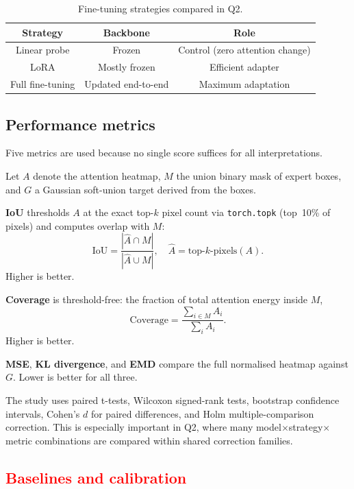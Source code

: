 \documentclass[lineno,pdflatex,sn-mathphys-num]{sn-jnl}%
\theoremstyle{thmstyleone}%
\theoremstyle{thmstyletwo}%
\theoremstyle{thmstylethree}%
\begin{document}
\begin{table}[!h]
\centering
\caption{Fine-tuning strategies compared in Q2. \label{table fine tuning list}}
\begin{tabular}{ccc}
\toprule
Strategy & Backbone & Role \\ \midrule
Linear probe & Frozen & Control (zero attention change) \\
LoRA         & Mostly frozen & Efficient adapter \\
Full fine-tuning   & Updated end-to-end & Maximum adaptation \\
\bottomrule
\end{tabular}
\end{table}

\subsection{Performance metrics}

Five metrics are used because no single score suffices for all interpretations.

Let $A$ denote the attention heatmap, $M$ the union binary mask of expert boxes, and $G$ a Gaussian soft-union target derived from the boxes.

\textbf{IoU} thresholds $A$ at the exact top-$k$ pixel count via
\texttt{torch.topk} (top~10\% of pixels) and computes overlap with $M$:
\begin{equation}
  \text{IoU} = \frac{|\hat{A} \cap M|}{|\hat{A} \cup M|}, \quad
  \hat{A} = \text{top-}k\text{-pixels}(A).
\end{equation}
Higher is better.

\textbf{Coverage} is threshold-free: the fraction of total attention energy
inside $M$,
\begin{equation}
  \text{Coverage} = \frac{\sum_{i \in M} A_i}{\sum_i A_i}.
\end{equation}
Higher is better.

\textbf{MSE}, \textbf{KL divergence}, and \textbf{EMD} compare the full
normalised heatmap against $G$. Lower is better for all three.


The study uses paired t-tests, Wilcoxon signed-rank tests, bootstrap confidence
intervals, Cohen's $d$ for paired differences, and Holm multiple-comparison
correction. This is especially important in Q2, where many
model$\times$strategy$\times$metric combinations are compared within shared
correction families.

\subsection{\textcolor{red}{Baselines and calibration}}
\end{document}
